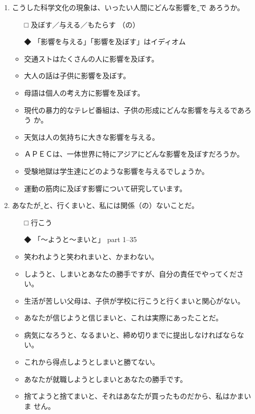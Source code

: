 \documentclass[
uplatex,
b5paper,
10pt,
dvipdfmx
]{jsbook}
\begin{document}
\begin{enumerate}
\item こうした科学文化の現象は、いったい人間にどんな影響を\underline{    }で
      あろうか。
\begin{itemize}
\item[□] 及ぼす／与える／もたらす （の）
\item[◆] 「影響を与える」「影響を及ぼす」はイディオム
\end{itemize}
\begin{itemize}
\item 交通ストはたくさんの人に影響を及ぼす。
\item 大人の話は子供に影響を及ぼす。
\item 母語は個人の考え方に影響を及ぼす。
\item 現代の暴力的なテレビ番組は、子供の形成にどんな影響を与えるであろう
      か。
\item 天気は人の気持ちに大きな影響を与える。
\item ＡＰＥＣは、一体世界に特にアジアにどんな影響を及ぼすだろうか。
\item 受験地獄は学生達にどのような影響を与えるでしょうか。
\item 運動の筋肉に及ぼす影響について研究しています。
\end{itemize}

\item あなたが\underline{     }と、行くまいと、私には関係（の）ないことだ。

\begin{itemize}
\item[□] 行こう
\item[◆] 「〜ようと〜まいと」 part 1--35
\end{itemize}
\begin{itemize}
\item 笑われようと笑われまいと、かまわない。
\item しようと、しまいとあなたの勝手ですが、自分の責任でやってください。
\item 生活が苦しい父母は、子供が学校に行こうと行くまいと関心がない。
\item あなたが信じようと信じまいと、これは実際にあったことだ。
\item 病気になろうと、なるまいと、締め切りまでに提出しなければならない。
\item これから得点しようとしまいと勝てない。
\item あなたが就職しようとしまいとあなたの勝手です。
\item 捨てようと捨てまいと、それはあなたが買ったものだから、私はかまいま
      せん。
\end{itemize}


\end{enumerate}
\end{document}
